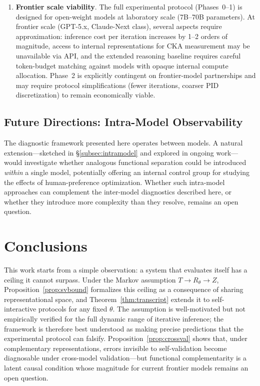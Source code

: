 \documentclass[11pt,a4paper]{article}
\theoremstyle{definition}
\newcommand{\Rtheta}{R_\theta}
\begin{document}
\begin{enumerate}[leftmargin=*,itemsep=3pt]
\item \textbf{Frontier scale viability}. The full experimental protocol (Phases~0--1) is designed for open-weight models at laboratory scale (7B--70B parameters). At frontier scale (GPT-5.x, Claude-Next class), several aspects require approximation: inference cost per iteration increases by 1--2 orders of magnitude, access to internal representations for CKA measurement may be unavailable via API, and the extended reasoning baseline requires careful token-budget matching against models with opaque internal compute allocation. Phase~2 is explicitly contingent on frontier-model partnerships and may require protocol simplifications (fewer iterations, coarser PID discretization) to remain economically viable.
\end{enumerate}


\subsection{Future Directions: Intra-Model Observability}
\label{subsec:interintra}

The diagnostic framework presented here operates between models. A natural extension---sketched in \S\ref{subsec:intramodel} and explored in ongoing work---would investigate whether analogous functional separation could be introduced \emph{within} a single model, potentially offering an internal control group for studying the effects of human-preference optimization. Whether such intra-model approaches can complement the inter-model diagnostics described here, or whether they introduce more complexity than they resolve, remains an open question.


\section{Conclusions}
\label{sec:conclusions}

This work starts from a simple observation: a system that evaluates itself has a ceiling it cannot surpass. Under the Markov assumption $T \to \Rtheta \to Z$, Proposition~\ref{prop:svbound} formalizes this ceiling as a consequence of sharing representational space, and Theorem~\ref{thm:transcript} extends it to self-interactive protocols for any fixed $\theta$. The assumption is well-motivated but not empirically verified for the full dynamic range of iterative inference; the framework is therefore best understood as making precise predictions that the experimental protocol can falsify. Proposition~\ref{prop:crossval} shows that, under complementary representations, errors invisible to self-validation become diagnosable under cross-model validation---but functional complementarity is a latent causal condition whose magnitude for current frontier models remains an open question.
\end{document}
